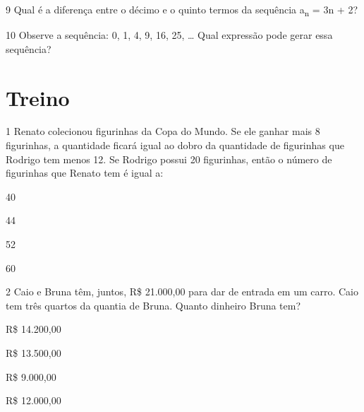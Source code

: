 \num{9} Qual é a diferença entre o décimo e o quinto termos da sequência 
a\textsubscript{n} = 3n + 2?

\begin{emptybox}
\vspace{5cm}
\end{emptybox}

\num{10} Observe a sequência: 0, 1, 4, 9, 16, 25, \ldots{}
Qual expressão pode gerar essa sequência?

\begin{emptybox}
\vspace{5cm}
\end{emptybox}

\section*{Treino}

\num{1} Renato colecionou figurinhas da Copa do Mundo. Se ele ganhar mais 8
figurinhas, a quantidade ficará igual ao dobro da quantidade de figurinhas 
que Rodrigo tem menos 12. Se Rodrigo possui 20 figurinhas, então o número de
figurinhas que Renato tem é igual a:

\begin{escolha}

  \item 40

  \item 44

  \item 52

  \item 60

\end{escolha}


\num{2} Caio e Bruna têm, juntos, R\$ 21.000,00 para dar de entrada em um
carro. Caio tem três quartos da quantia de Bruna. Quanto dinheiro Bruna tem?

\begin{escolha}
  \item R\$ 14.200,00

  \item R\$ 13.500,00

  \item R\$ 9.000,00

  \item R\$ 12.000,00
\end{escolha}

